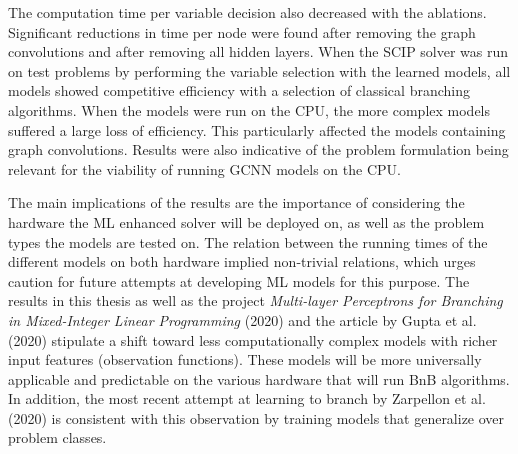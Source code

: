 The computation time per variable decision also decreased with the ablations. Significant reductions in time per node were found after removing the graph convolutions and after removing all hidden layers. When the \gls{SCIP} solver was run on test problems by performing the variable selection with the learned models, all models showed competitive efficiency with a selection of classical branching algorithms. When the models were run on the \gls{CPU}, the more complex models suffered a large loss of efficiency. This particularly affected the models containing graph convolutions. Results were also indicative of the problem formulation being relevant for the viability of running \gls{GCNN} models on the \gls{CPU}. 

The main implications of the results are the importance of considering the hardware the \gls{ML} enhanced solver will be deployed on, as well as the problem types the models are tested on. The relation between the running times of the different models on both hardware implied non-trivial relations, which urges caution for future attempts at developing \gls{ML} models for this purpose. The results in this thesis as well as the project \textit{Multi-layer Perceptrons for Branching in Mixed-Integer Linear Programming} (2020) and the article by Gupta et al. (2020) \cite{gupta2020hybrid} stipulate a shift toward less computationally complex models with richer input features (observation functions). These models will be more universally applicable and predictable on the various hardware that will run \gls{BnB} algorithms. In addition, the most recent attempt at learning to branch by Zarpellon et al. (2020) \cite{zarpellon2020parameterizing} is consistent with this observation by training models that generalize over problem classes.


